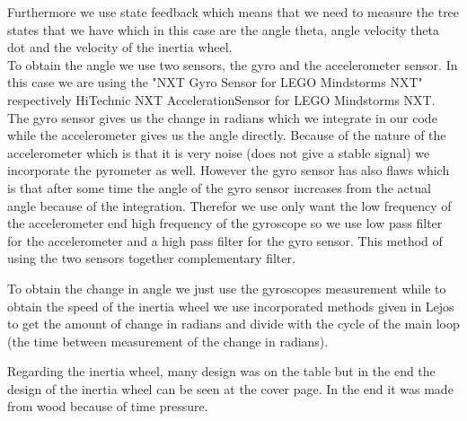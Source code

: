\documentclass[a4paper]{article}
\begin{document}
Furthermore we use state feedback which means that we need to measure the tree states that we have which in this case are the angle theta, angle velocity theta dot and the velocity of the inertia wheel. \\To obtain the angle we use two sensors, the gyro and the accelerometer sensor. In this case we are using the "NXT Gyro Sensor for LEGO Mindstorms NXT" respectively HiTechnic NXT AccelerationSensor for LEGO Mindstorms NXT. The gyro sensor gives us the change in radians which we integrate in our code while the accelerometer gives us the angle directly. Because of the nature of the accelerometer which is that it is very noise (does not give a stable signal) we incorporate the pyrometer as well. However the gyro sensor has also flaws which is that after some time the angle of the gyro sensor increases from the actual angle because of the integration. Therefor we use only want the low frequency of the accelerometer end high frequency of the gyroscope so we use low pass filter for the accelerometer and a high pass filter for the gyro sensor. This method of using the two sensors together complementary filter. 

To obtain the change in angle we just use the gyroscopes measurement while to obtain the speed of the inertia wheel we use incorporated methods given in Lejos to get the amount of change in radians and divide with the cycle of the main loop (the time between measurement of the change in radians). 

Regarding the inertia wheel, many design was on the table but in the end the design of the inertia wheel can be seen at the cover page. In the end it was made from wood because of time pressure. 
\end{document}
